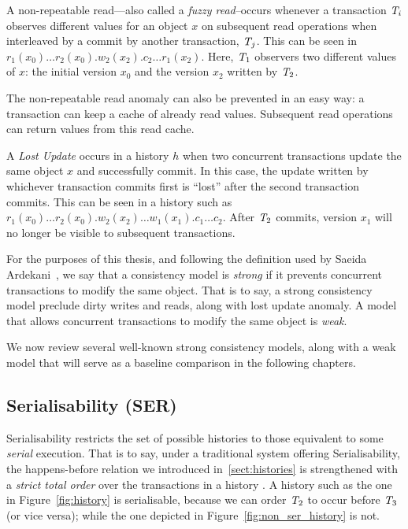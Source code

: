 \begin{definition}
A non-repeatable read---also called a \emph{fuzzy read}--occurs whenever a transaction $\mathit{T}_i$ observes different values for an object $x$ on subsequent read operations when interleaved by a commit by another transaction, $\mathit{T}_j$. This can be seen in $r_1(x_0)\ldots r_2(x_0).w_2(x_2).c_2 \ldots r_1(x_2)$. Here, $\mathit{T}_1$ observers two different values of $x$: the initial version $x_0$ and the version $x_2$ written by $\mathit{T}_2$.
\end{definition}

The non-repeatable read anomaly can also be prevented in an easy way: a transaction can keep a cache of already read values. Subsequent read operations can return values from this read cache.

\begin{definition}
A \emph{Lost Update} occurs in a history $h$ when two concurrent transactions update the same object $x$ and successfully commit. In this case, the update written by whichever transaction commits first is ``lost'' after the second transaction commits. This can be seen in a history such as $r_1(x_0)\ldots r_2(x_0).w_2(x_2) \ldots w_1(x_1).c_1\ldots c_2$. After $\mathit{T}_2$ commits, version $x_1$ will no longer be visible to subsequent transactions.
\end{definition}

For the purposes of this thesis, and following the definition used by Saeida Ardekani~\citep{ardekani_thesis}, we say that a consistency model is \emph{strong} if it prevents concurrent transactions to modify the same object. That is to say, a strong consistency model preclude dirty writes and reads, along with lost update anomaly. A model that allows concurrent transactions to modify the same object is \emph{weak}.

We now review several well-known strong consistency models, along with a weak model that will serve as a baseline comparison in the following chapters.

\subsection{Serialisability (SER)}

Serialisability restricts the set of possible histories to those equivalent to some \emph{serial} execution. That is to say, under a traditional system offering Serialisability, the happens-before relation we introduced in~\ref{sect:histories} is strengthened with a \emph{strict total order} over the transactions in a history . A history such as the one in Figure~\ref{fig:history} is serialisable, because we can order $\mathit{T}_2$ to occur before $\mathit{T}_3$ (or vice versa); while the one depicted in Figure~\ref{fig:non_ser_history} is not.

